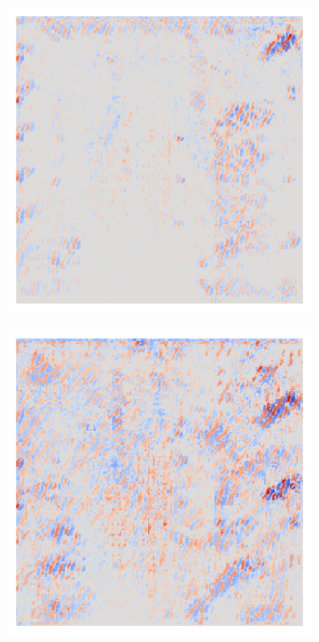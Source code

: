 \begin{figure}[H]
    \centering
        \begin{subfigure}{0.19\linewidth}
            \centering
            \includegraphics[height=1\linewidth]{01-images/05-resultate/uap_resnet18/uap0-resnet18-covidx_data-n200-robustificationslevel0.png}
        \end{subfigure}\hfill%
        \begin{subfigure}{0.19\linewidth}
            \centering
            \includegraphics[height=1\linewidth]{01-images/05-resultate/uap_resnet18/uap1-resnet18-covidx_data-n200-robustificationslevel0.png}

\end{subfigure}
\end{figure}
